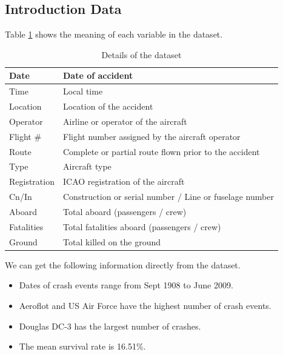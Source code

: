 \documentclass[12pt]{article}
\begin{document}
\subsection{Introduction Data}
Table \ref{tab:data summary} shows the meaning of each variable in the dataset. 
\begin{longtable}[c]{ll}
\caption{Details of the dataset}
\label{tab:data summary} \\
\hline
Date         & Date of accident                                        \\
\endfirsthead
%
\endhead
%
\hline
\endfoot
%
\endlastfoot
%
Time         & Local time                                              \\
Location     & Location of the accident                                \\
Operator     & Airline or operator of the aircraft                     \\
Flight \#    & Flight number assigned by the aircraft operator         \\
Route        & Complete or partial route flown prior to the accident   \\
Type         & Aircraft type                                           \\
Registration & ICAO registration of the aircraft                       \\
Cn/In        & Construction or serial number / Line or fuselage number \\
Aboard       & Total aboard (passengers / crew)                        \\
Fatalities   & Total fatalities aboard (passengers / crew)             \\
Ground       & Total killed on the ground                              \\ \hline
\end{longtable}

We can get the following information directly from the dataset.  
\begin{itemize}
    \item Dates of crash events range from Sept 1908 to June 2009. 
    \item Aeroflot and US Air Force have the highest number of crash events. 
    \item Douglas DC-3 has the largest number of crashes.
    \item The mean survival rate is 16.51\%. 
\end{itemize}
\end{document}
